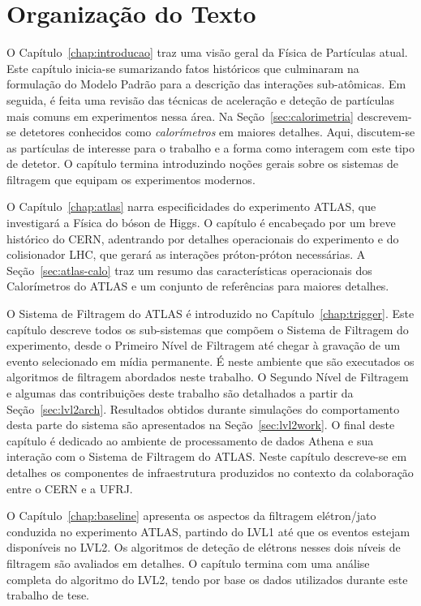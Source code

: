 \section{Organização do Texto}

O Capítulo~\ref{chap:introducao} traz uma visão geral da Física de Partículas
atual. Este capítulo inicia-se sumarizando fatos históricos que culminaram na
formulação do Modelo Padrão para a descrição das interações sub-atômicas. Em
seguida, é feita uma revisão das técnicas de aceleração e deteção de
partículas mais comuns em experimentos nessa área. Na
Seção~\ref{sec:calorimetria} descrevem-se detetores conhecidos como
\textit{calorímetros} em maiores detalhes. Aqui, discutem-se as partículas de
interesse para o trabalho e a forma como interagem com este tipo de detetor. O
capítulo termina introduzindo noções gerais sobre os sistemas de filtragem que
equipam os experimentos modernos.

O Capítulo~\ref{chap:atlas} narra especificidades do experimento ATLAS, que
investigará a Física do bóson de Higgs. O capítulo é encabeçado por um breve
histórico do CERN, adentrando por detalhes operacionais do experimento e do
colisionador LHC, que gerará as interações próton-próton necessárias. A
Seção~\ref{sec:atlas-calo} traz um resumo das características operacionais dos
Calorímetros do ATLAS e um conjunto de referências para maiores detalhes.

O Sistema de Filtragem do ATLAS é introduzido no
Capítulo~\ref{chap:trigger}. Este capítulo descreve todos os sub-sistemas que
compõem o Sistema de Filtragem do experimento, desde o Primeiro Nível de
Filtragem até chegar à gravação de um evento selecionado em mídia
permanente. É neste ambiente que são executados os algoritmos de filtragem
abordados neste trabalho. O Segundo Nível de Filtragem e algumas das
contribuições deste trabalho são detalhados a partir da
Seção~\ref{sec:lvl2arch}. Resultados obtidos durante simulações do
comportamento desta parte do sistema são apresentados na
Seção~\ref{sec:lvl2work}. O final deste capítulo é dedicado ao ambiente de
processamento de dados Athena e sua interação com o Sistema de Filtragem do
ATLAS. Neste capítulo descreve-se em detalhes os componentes de infraestrutura
produzidos no contexto da colaboração entre o CERN e a UFRJ.

O Capítulo~\ref{chap:baseline} apresenta os aspectos da filtragem elétron/jato
conduzida no experimento ATLAS, partindo do LVL1 até que os eventos estejam
disponíveis no LVL2. Os algoritmos de deteção de elétrons nesses dois níveis
de filtragem são avaliados em detalhes. O capítulo termina com uma análise
completa do algoritmo do LVL2, tendo por base os dados utilizados durante este
trabalho de tese.

